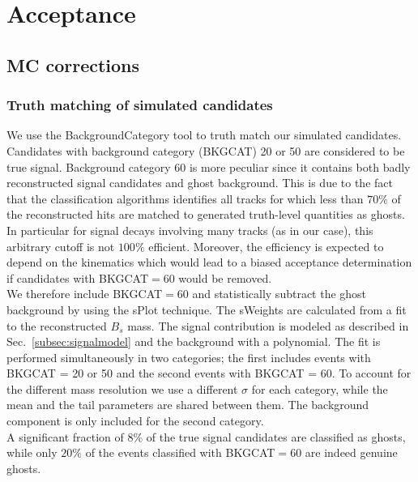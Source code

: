 \section{Acceptance}
\label{sec:Acceptance}

\subsection{MC corrections}

\subsubsection{Truth matching of simulated candidates}

We use the \textsf{BackgroundCategory} tool to truth match our simulated candidates. 
Candidates with background category (\textsf{BKGCAT}) 20 or 50 are considered to be true signal. 
Background category 60 is more peculiar since it contains both badly reconstructed
signal candidates and ghost background.
This is due to the fact that the classification algorithms identifies all tracks 
for which less than $70\%$ of the reconstructed hits are matched to generated truth-level quantities as ghosts.
In particular for signal decays involving many tracks (as in our case),
this arbitrary cutoff is not $100\%$ efficient.
Moreover, the efficiency is expected to depend on the kinematics which would lead to a biased acceptance determination
if candidates with \textsf{BKGCAT}$=60$ would be removed. \\
We therefore include \textsf{BKGCAT}$=60$ and statistically subtract the ghost background by using the \textsf{sPlot} technique.
The \textsf{sWeights} are calculated from a fit to the reconstructed $B_s$ mass.  
The signal contribution is modeled as described in Sec.~\ref{subsec:signalmodel} and the background with a polynomial.
The fit is performed simultaneously in two categories; the first includes events with \textsf{BKGCAT} = 20 or 50 and
the second events with \textsf{BKGCAT}  = 60.
To account for the different mass resolution we use a different $\sigma$ for each category,
while the mean and the tail parameters are shared between them. 
The background component is only included for the second category.
\\
A significant fraction of $8\%$ of the true signal candidates are classified as ghosts,
while only $20 \%$ of the events classified with \textsf{BKGCAT}$=60$ are indeed genuine ghosts.




